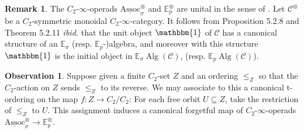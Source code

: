 \documentclass{article}
\DeclareMathOperator{\Alg}{Alg}
\newcommand{\EE}{\mathbb{E}}
\newcommand{\Assoc}{\mathrm{Assoc}}
\theoremstyle{definition}
\newtheorem{remark}[equation]{Remark}
\newtheorem{observation}[equation]{Observation}
\begin{document}
\begin{remark}\label{rmk:E_sigma_operad_unital}
    The $ C_2 $-$ \infty $-operads $ \underline{\Assoc}_\sigma^\otimes $ and $ \EE_p^\otimes $ are unital in the sense of \cite[Definition 5.2.1]{NS22}. 
    Let $ \mathcal{C}^\otimes $ be a $ C_2 $-symmetric monoidal $ C_2 $-$ \infty $-category. %
    It follows from Proposition 5.2.8 and Theorem 5.2.11 \emph{ibid.} that the unit object $ \mathbbm{1} $ of $ \mathcal{C} $ has a canonical structure of an $ \EE_\sigma $ (resp. $ \EE_p $-)algebra, and moreover with this structure $ \mathbbm{1} $ is the initial object in $ \EE_\sigma\Alg\left(\mathcal{C}\right) $, (resp. $ \EE_p\Alg\left(\mathcal{C}\right) $). 
\end{remark}
\begin{observation}
    Suppose given a finite $ C_2 $-set $ Z $ and an ordering $ \leq_Z $ so that the $ C_2 $-action on $ Z $ sends $ \leq_Z $ to its reverse. 
    We may associate to this a canonical t-ordering on the map $ f \colon Z \to C_2/C_2 $: For each free orbit $ U \subseteq Z $, take the restriction of $ \leq_Z $ to $ U $. 
    This assignment induces a canonical forgetful map of $ C_2 $-$ \infty $-operads $ \underline{\Assoc}_\sigma^\otimes \to \EE_p^\otimes $.  
\end{observation}
\end{document}

